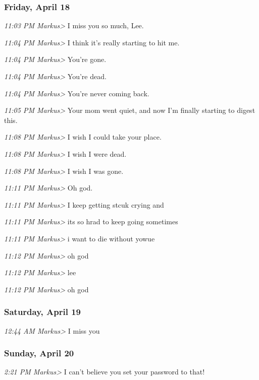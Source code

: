 {\subsubsection*{Friday, April 18}\label{friday-april-18}

\emph{11:03 PM Markus\textgreater{}} I miss you so much, Lee.

\emph{11:04 PM Markus\textgreater{}} I think it's really starting to hit
me.

\emph{11:04 PM Markus\textgreater{}} You're gone.

\emph{11:04 PM Markus\textgreater{}} You're dead.

\emph{11:04 PM Markus\textgreater{}} You're never coming back.

\emph{11:05 PM Markus\textgreater{}} Your mom went quiet, and now I'm
finally starting to digest this.

\emph{11:08 PM Markus\textgreater{}} I wish I could take your place.

\emph{11:08 PM Markus\textgreater{}} I wish I were dead.

\emph{11:08 PM Markus\textgreater{}} I wish I was gone.

\emph{11:11 PM Markus\textgreater{}} Oh god.

\emph{11:11 PM Markus\textgreater{}} I keep getting stcuk crying and

\emph{11:11 PM Markus\textgreater{}} its so hrad to keep going sometimes

\emph{11:11 PM Markus\textgreater{}} i want to die without yowue

\emph{11:12 PM Markus\textgreater{}} oh god

\emph{11:12 PM Markus\textgreater{}} lee

\emph{11:12 PM Markus\textgreater{}} oh god

\subsubsection*{Saturday, April 19}\label{saturday-april-19}

\emph{12:44 AM Markus\textgreater{}} I miss you

\subsubsection*{Sunday, April 20}\label{sunday-april-20}

\emph{2:21 PM Markus\textgreater{}} I can't believe you set your
password to that!

}

